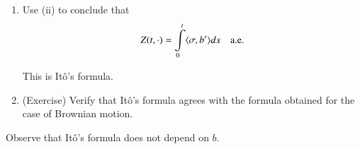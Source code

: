 \begin{exer*}
\begin{enumerate}
The assumptions on $\phi$ imply that $Z$ is an It\^o process
corresponding to 
$$
(\langle \sigma,b'\rangle,\sigma A\sigma^{*})\equiv \left(\frac{\p
  \phi}{\p t}+\frac{1}{2}\sum a_{ij}\frac{\p^{2}\phi}{\p x_{i}\p
  x_{j}},0\right). 
$$

\item Use (ii) to conclude that
$$
Z(t,\cdot)=\int\limits^{t}_{0}\langle \sigma,b'\rangle ds\quad\text{a.e.}
$$

This is It\^o's formula.

\item (Exercise) Verify that It\^o's formula agrees with the formula
  obtained for the case of Brownian motion.
\end{enumerate}
\end{exer*}

\begin{note*}
Observe that It\^o's formula does not depend on $b$.
\end{note*}

